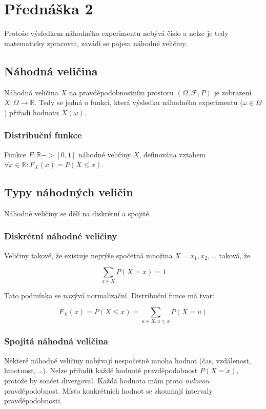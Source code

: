 \section{Přednáška 2}

Protože výsledkem náhodného experimentu nebývá číslo a nelze je tedy matematicky zpracovat, zavádí se pojem náhodné veličiny.

\subsection{Náhodná veličina}

Náhodná veličina $X$ na pravděpodobnostním prostoru $(\Omega, \mathcal{F}, P)$ je zobrazení $X: \Omega \rightarrow \mathbb{R}$.
Tedy se jedná o funkci, která výsledku náhodného experimentu ($\omega \in \Omega$) přiřadí hodnotu $X(\omega)$.

\subsubsection*{Distribuční funkce}

Funkce $F: \mathbb{R} -> [0,1] $ náhodné veličiny $X$, definována vztahem $\forall{x \in \mathbb{R}}: F_X(x) = P(X \leq x)$.

\subsection{Typy náhodných veličin}


Náhodné veličiny se dělí na diskrétní a spojité.

\subsubsection*{Diskrétní náhodné veličiny}

Veličiny takové, že existuje nejvýše spočetná množina $X = {x_1, x_2, \dots}$ taková, že

$$
    \sum_{x \in X}{P(X=x)} = 1
$$

Tato podmínka se nazývá normalizační.
Distribuční funce má tvar:

$$
    F_X(x) = P(X \leq x) = \sum_{u \in X, u \leq x}{P(X = u)}
$$

\subsubsection*{Spojitá náhodná veličina}

Některé náhodné veličiny nabývají nespočetně mnoha hodnot (čas, vzdálenost, hmotnost, \dots).
Nelze přiřadit každé hodnotě pravděpodobnost $P(X = x)$, protože by součet divergoval.
Každá hodnota mám proto \textit{nulovou} pravděpodobnost.
Místo konkrétních hodnot se zkoumají intervaly pravděpodobnosti.

